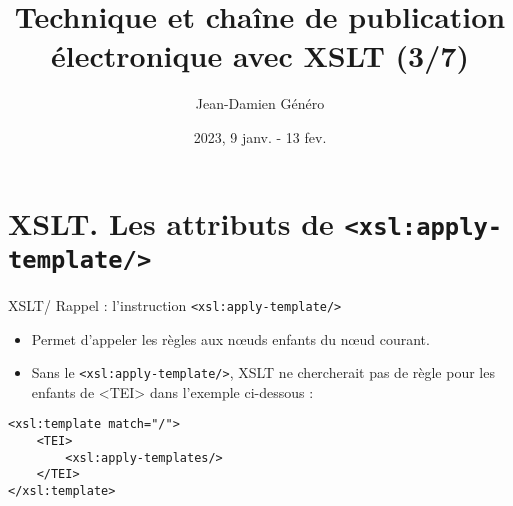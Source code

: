 \documentclass{beamer}
\title{Technique et chaîne de publication électronique avec XSLT (3/7)}
\date{2023, 9 janv. - 13 fev.}
\author{Jean-Damien Généro}
\institute{École nationale des chartes -- M2 TNAH}
\begin{document}
    \maketitle

    \section{XSLT. Les attributs de \texttt{<xsl:apply-template/>}}

    \begin{frame}[fragile]{XSLT/ Rappel : l'instruction \texttt{<xsl:apply-template/>}}
        \Large
        \begin{itemize}
            \item Permet d'appeler les règles aux n\oe uds enfants du n\oe ud courant.
            \item Sans le \texttt{<xsl:apply-template/>}, XSLT ne chercherait pas de règle pour les enfants de <TEI> dans l'exemple ci-dessous :
        \end{itemize}
        \begin{verbatim}
<xsl:template match="/">
    <TEI>
        <xsl:apply-templates/>
    </TEI>
</xsl:template>
        \end{verbatim}
    \end{frame}
\end{document}
